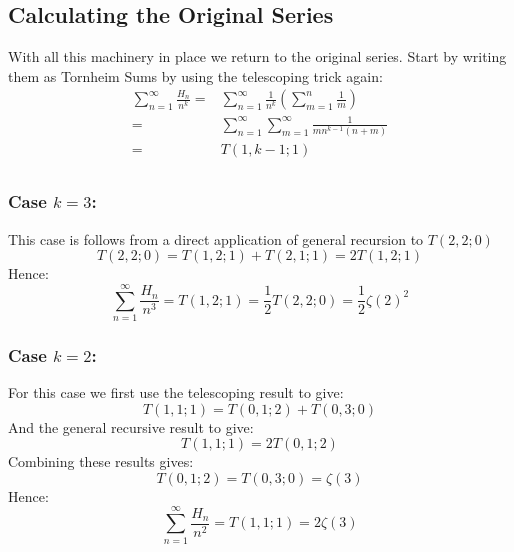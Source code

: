 \subsection{Calculating the Original Series}
With all this machinery in place we return to the original series.
Start by writing them as Tornheim Sums by using the telescoping trick again:
\begin{equation*}
\begin{aligned}
	\sum_{n=1}^\infty\frac{H_n}{n^k} =& \sum_{n=1}^\infty\frac{1}{n^k}\left(\sum_{m=1}^{n}\frac{1}{m}\right)\\
	=& \sum_{n=1}^\infty\sum_{m=1}^\infty\frac{1}{mn^{k-1}(n+m)}\\
	=& T(1,k-1;1)\\
\end{aligned}
\end{equation*}

\subsubsection{Case $k=3$:}
This case is follows from a direct application of general recursion to $T(2,2;0)$
\[T(2,2;0) = T(1,2;1)+T(2,1;1) = 2T(1,2;1)\]
Hence:
\[\sum_{n=1}^\infty\frac{H_n}{n^3} = T(1,2;1) = \frac{1}{2}T(2,2;0) = \frac{1}{2}\zeta(2)^2\]

\subsubsection{Case $k=2$:}
For this case we first use the telescoping result to give:
\[T(1,1;1) = T(0,1;2)+T(0,3;0)\]
And the general recursive result to give:
\[T(1,1;1) = 2T(0,1;2)\]
Combining these results gives:
\[T(0,1;2) = T(0,3;0) = \zeta(3)\]
Hence:
\[\sum_{n=1}^\infty\frac{H_n}{n^2} = T(1,1;1) = 2\zeta(3)\]


